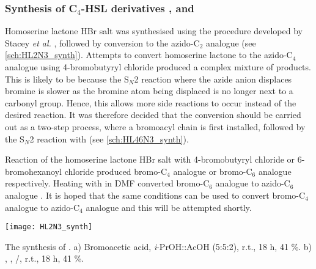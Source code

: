 \subsubsection{Synthesis of C$_4$-HSL derivatives ,  and \label{sec:HL4N3}}

Homoserine lactone HBr salt  was synthesised using the procedure developed by Stacey \textit{et al.} \cite{Stacy2013}, followed by conversion to the azido-C$_2$ analogue  (see \ref{sch:HL2N3_synth}). Attempts to convert homoserine lactone  to the azido-C$_4$ analogue using 4-bromobutyryl chloride  produced a complex mixture of products. This is likely to be because the S$_N$2 reaction where the azide anion displaces bromine is slower as the bromine atom being displaced is no longer next to a carbonyl group. Hence, this allows more side reactions to occur instead of the desired reaction. It was therefore decided that the conversion should be carried out as a two-step process, where a bromoacyl chain is first installed, followed by the S$_N$2 reaction with  (see \ref{sch:HL46N3_synth}). 

Reaction of the homoserine lactone HBr salt  with 4-bromobutyryl chloride  or 6-bromohexanoyl chloride  produced bromo-C$_4$ analogue  or bromo-C$_6$ analogue  respectively. Heating with  in DMF converted bromo-C$_6$ analogue  to azido-C$_6$ analogue \cite{Baker2012}. It is hoped that the same conditions can be used to convert bromo-C$_4$ analogue  to azido-C$_4$ analogue  and this will be attempted shortly.

\begin{scheme}[H]
	\begin{center}
		\texttt{[image: HL2N3\_synth]}
		\caption{The synthesis of .
		a) Bromoacetic acid, \textit{i}-PrOH::AcOH (5:5:2), r.t., 18 h, 41 \%.
		b) , , /, r.t., 18 h, 41 \%.
		\label{sch:HL2N3_synth}}
	\end{center}
\end{scheme}
%

